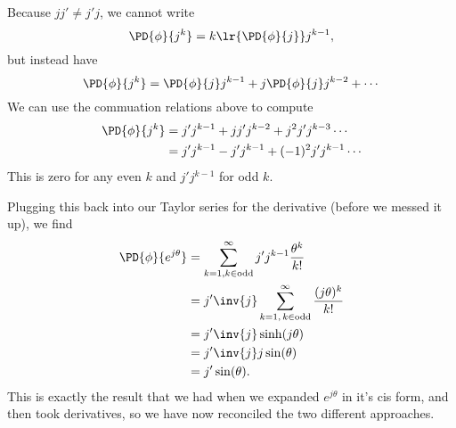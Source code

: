 {Because \( j j' \ne j' j \), we cannot write
\begin{equation}\label{eqn:dexpquestion:n}
\PD{\phi}{j^k} = k \lr{ \PD{\phi}{j} } j^{k-1},
\end{equation}
but instead have
\begin{equation}\label{eqn:dexpquestion:100}
\PD{\phi}{j^k} = \PD{\phi}{j} j^{k-1} + j \PD{\phi}{j} j^{k-2} + \cdots
\end{equation}
We can use the commuation relations above to compute
\begin{equation}\label{eqn:dexpquestion:260}
\begin{aligned}
\PD{\phi}{j^k}
&= j' j^{k-1} + j j' j^{k-2} + j^2 j' j^{k-3} \cdots \\
&= j' j^{k-1} - j' j^{k-1} + (-1)^2 j' j^{k-1} \cdots
\end{aligned}
\end{equation}
This is zero for any even \( k \) and \( j' j^{k-1} \) for odd \( k \).

Plugging this back into our Taylor series for the derivative (before we messed it up), we find
\begin{equation}\label{eqn:dexpquestion:280}
\begin{aligned}
\PD{\phi}{e^{j\theta}}
&= \sum_{k = 1, k \in \mathrm{odd}}^\infty j' j^{k-1} \frac{ \theta^k }{k!} \\
&= j' \inv{j}
\sum_{k = 1,\, k \in \mathrm{odd}}^\infty \frac{ (j\theta)^k }{k!} \\
&= j' \inv{j} \sinh( j \theta ) \\
&= j' \inv{j} j \sin( \theta ) \\
&= j' \sin( \theta ).
\end{aligned}
\end{equation}
This is exactly the result that we had when we expanded \( e^{j\theta} \) in it's cis form, and then took derivatives, so we have now reconciled the two different approaches.
} %
